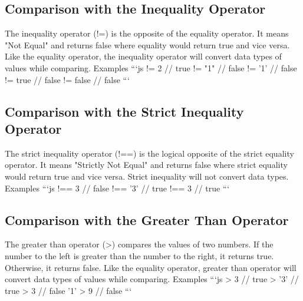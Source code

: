\documentclass{article}%
\begin{document}
%
\subsection{Comparison with the Inequality Operator}%
\label{subsec:ComparisonwiththeInequalityOperator}%
The inequality operator (!=) is the opposite of the equality operator. It means "Not Equal" and returns false where equality would return true and vice versa. Like the equality operator, the inequality operator will convert data types of values while comparing.\newline%
Examples\newline%
```js !=  2     // true != "1"    // false != '1'    // false != true   // false != false  // false\newline%
```\newline%

%
\subsection{Comparison with the Strict Inequality Operator}%
\label{subsec:ComparisonwiththeStrictInequalityOperator}%
The strict inequality operator (!==) is the logical opposite of the strict equality operator. It means "Strictly Not Equal" and returns false where strict equality would return true and vice versa. Strict inequality will not convert data types.\newline%
Examples\newline%
```js !==  3   // false !== '3'  // true !==  3   // true\newline%
```\newline%

%
\subsection{Comparison with the Greater Than Operator}%
\label{subsec:ComparisonwiththeGreaterThanOperator}%
The greater than operator (>) compares the values of two numbers. If the number to the left is greater than the number to the right, it returns true. Otherwise, it returns false.\newline%
Like the equality operator, greater than operator will convert data types of values while comparing.\newline%
Examples\newline%
```js   >  3   // true   > '3'  // true   >  3   // false\newline%
'1' >  9   // false\newline%
```\newline%
\end{document}
